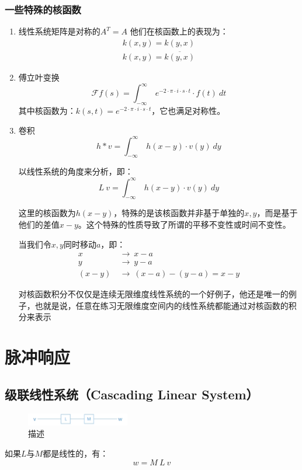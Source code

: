 \subsubsection{一些特殊的核函数}
\begin{enumerate}
	\item 线性系统矩阵是对称的$A^T=A$
	      他们在核函数上的表现为：
	      \begin{align*}
		      k(x,y)=k(y,x) \\
		      k(x,y)=\overline{k(y,x)}
	      \end{align*}
	\item 傅立叶变换
	      $$
		      \mathcal{F}f(s)=\int_{-\infty}^\infty\ e^{-2\cdot\pi\cdot i\cdot s\cdot t}\cdot f(t)\ dt
	      $$
	      其中核函数为：$k(s,t)=e^{-2\cdot\pi\cdot i\cdot s\cdot t}$，它也满足对称性。
	\item 卷积
	      $$
		      h*v = \int_{-\infty}^{\infty}\ h(x-y)\cdot v(y)\ dy
	      $$

	      以线性系统的角度来分析，即：
	      $$
		      L\ v = \int_{-\infty}^{\infty}\ h(x-y)\cdot v(y)\ dy
	      $$

	      这里的核函数为$h(x−y)$，特殊的是该核函数并非基于单独的$x,y$，而是基于他们的差值$x−y$。这个特殊的性质导致了所谓的平移不变性或时间不变性。

	      当我们令$x,y$同时移动$a$，即：
	      \begin{align*} x\ &\rightarrow \ x-a \\ y\ &\rightarrow \ y-a \\ (x-y)\ &\rightarrow \ (x-a)-(y-a)=x-y \end{align*}

	      对核函数积分不仅仅是连续无限维度线性系统的一个好例子，他还是唯一的例子，也就是说，任意在练习无限维度空间内的线性系统都能通过对核函数的积分来表示
\end{enumerate}
\section{脉冲响应}
\subsection{级联线性系统（Cascading Linear System）}
\begin{figure}[H]
	\centering
	\includegraphics[width=0.4\textwidth]{assets/inpulse.jpg}
	\caption{描述}
\end{figure}
如果$L$与$M$都是线性的，有：
$$
	w=M\ L\ v
$$

